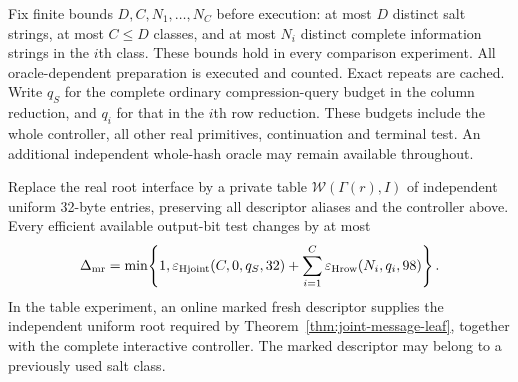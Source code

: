 Fix finite bounds $D,C,N_1,\ldots,N_C$ before execution: at most $D$ distinct
salt strings, at most $C\le D$ classes, and at most $N_i$ distinct complete
information strings in the $i$th class. These bounds hold in every comparison
experiment. All oracle-dependent preparation is executed and counted. Exact
repeats are cached. Write $q_S$ for the complete ordinary compression-query
budget in the column reduction, and $q_i$ for that in the $i$th row reduction.
These budgets include the whole controller, all other real primitives,
continuation and terminal test. An additional independent whole-hash oracle
may remain available throughout.

\begin{theorem}
\label{thm:multiple-root-entry}
Replace the real root interface by a private table
$\mathcal W(\Gamma(r),I)$ of independent uniform 32-byte entries, preserving
all descriptor aliases and the controller above. Every efficient available
output-bit test changes by at most
\begin{equation}
 \Delta_{\rm mr}=\min\!\left\{1,
 \varepsilon_{\rm Hjoint}(C,0,q_S,32)
 +\sum_{i=1}^{C}\varepsilon_{\rm Hrow}(N_i,q_i,98)\right\}.
 \label{eq:multiple-root-error}
\end{equation}
In the table experiment, an online marked fresh descriptor supplies the
independent uniform root required by
Theorem~\ref{thm:joint-message-leaf}, together with the complete interactive
controller. The marked descriptor may belong to a previously used salt class.
\end{theorem}

